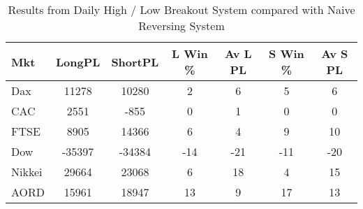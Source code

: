 \begin{table}[ht]
\centering
\caption[Daily High / Low Breakout System compared with Naive Reversing System]{Results from Daily High / Low Breakout System compared with Naive Reversing System} 
\label{tab:hl_bout_sys_diff}
\begin{tabular}{lcccccc}
  \toprule Mkt & LongPL & ShortPL & L Win \% & Av L PL & S Win \% & Av S PL \\ 
  \midrule Dax & 11278 & 10280 & 2 & 6 & 5 & 6 \\ 
  CAC & 2551 & -855 & 0 & 1 & 0 & 0 \\ 
  FTSE & 8905 & 14366 & 6 & 4 & 9 & 10 \\ 
  Dow & -35397 & -34384 & -14 & -21 & -11 & -20 \\ 
  Nikkei & 29664 & 23068 & 6 & 18 & 4 & 15 \\ 
  AORD & 15961 & 18947 & 13 & 9 & 17 & 13 \\ 
   \bottomrule \end{tabular}
\end{table}
